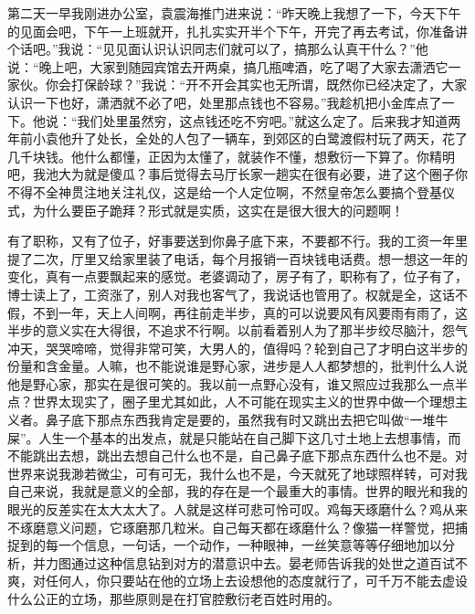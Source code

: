 \documentclass[12pt,oneside]{book}
\begin{document}
第二天一早我刚进办公室，袁震海推门进来说：``昨天晚上我想了一下，今天下午的见面会吧，下午一上班就开，扎扎实实开半个下午，开完了再去考试，你准备讲个话吧。''我说：``见见面认识认识同志们就可以了，搞那么认真干什么？''他说：``晚上吧，大家到随园宾馆去开两桌，搞几瓶啤酒，吃了喝了大家去潇洒它一家伙。你会打保龄球？''我说：``开不开会其实也无所谓，既然你已经决定了，大家认识一下也好，潇洒就不必了吧，处里那点钱也不容易。''我趁机把小金库点了一下。他说：``我们处里虽然穷，这点钱还吃不穷吧。''就这么定了。后来我才知道两年前小袁他升了处长，全处的人包了一辆车，到郊区的白鹭渡假村玩了两天，花了几千块钱。他什么都懂，正因为太懂了，就装作不懂，想敷衍一下算了。你精明吧，我池大为就是傻瓜？事后觉得去马厅长家一趟实在很有必要，进了这个圈子你不得不全神贯注地关注礼仪，这是给一个人定位啊，不然皇帝怎么要搞个登基仪式，为什么要臣子跪拜？形式就是实质，这实在是很大很大的问题啊！

有了职称，又有了位子，好事要送到你鼻子底下来，不要都不行。我的工资一年里提了二次，厅里又给家里装了电话，每个月报销一百块钱电话费。想一想这一年的变化，真有一点要飘起来的感觉。老婆调动了，房子有了，职称有了，位子有了，博士读上了，工资涨了，别人对我也客气了，我说话也管用了。权就是全，这话不假，不到一年，天上人间啊，再往前走半步，真的可以说要风有风要雨有雨了，这半步的意义实在大得很，不追求不行啊。以前看着别人为了那半步绞尽脑汁，怨气冲天，哭哭啼啼，觉得非常可笑，大男人的，值得吗？轮到自己了才明白这半步的份量和含金量。人嘛，也不能说谁是野心家，进步是人人都梦想的，批判什么人说他是野心家，那实在是很可笑的。我以前一点野心没有，谁又照应过我那么一点半点？世界太现实了，圈子里尤其如此，人不可能在现实主义的世界中做一个理想主义者。鼻子底下那点东西我肯定是要的，虽然我有时又跳出去把它叫做``一堆牛屎''。人生一个基本的出发点，就是只能站在自己脚下这几寸土地上去想事情，而不能跳出去想，跳出去想自己什么也不是，自己鼻子底下那点东西什么也不是。对世界来说我渺若微尘，可有可无，我什么也不是，今天就死了地球照样转，可对我自己来说，我就是意义的全部，我的存在是一个最重大的事情。世界的眼光和我的眼光的反差实在太大太大了。人就是这样可悲可怜可叹。鸡每天琢磨什么？鸡从来不琢磨意义问题，它琢磨那几粒米。自己每天都在琢磨什么？像猫一样警觉，把捕捉到的每一个信息，一句话，一个动作，一种眼神，一丝笑意等等仔细地加以分析，并力图通过这种信息钻到对方的潜意识中去。晏老师告诉我的处世之道百试不爽，对任何人，你只要站在他的立场上去设想他的态度就行了，可千万不能去虚设什么公正的立场，那些原则是在打官腔敷衍老百姓时用的。
\end{document}
